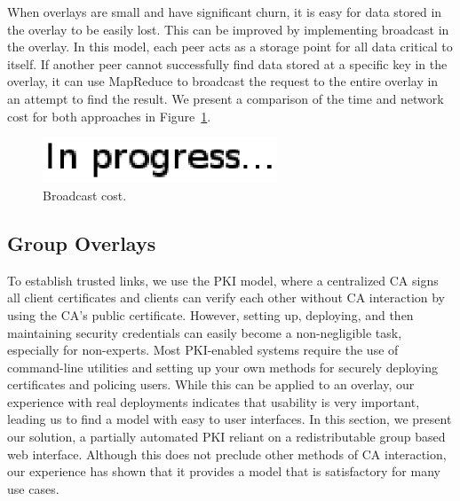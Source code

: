 \documentclass[conference]{IEEEtran}
\begin{document}
When overlays are small and have significant churn, it is easy for data stored
in the overlay to be easily lost.  This can be improved by implementing
broadcast in the overlay.  In this model, each peer acts as a
storage point for all data critical to itself.  If another peer cannot
successfully find data stored at a specific key in the overlay, it can use
MapReduce to broadcast the request to the entire overlay in an attempt to find
the result.  We present a comparison of the time and network cost for both
approaches in Figure~\ref{fig:broadcast_cost}.

\begin{figure}[h]
\centering
\includegraphics[width=2.75in]{in_progress.eps}
\caption{Broadcast cost.}
\label{fig:broadcast_cost}
\end{figure}

\subsection{Group Overlays}
\label{group_overlays}
To establish trusted links, we use the PKI model, where a centralized CA signs
all client certificates and clients can verify each other without CA interaction
by using the CA's public certificate.  However, setting up, deploying, and then
maintaining security credentials can easily become a non-negligible task,
especially for non-experts.  Most PKI-enabled systems require the use of
command-line utilities and setting up your own methods for securely
deploying certificates and policing users.  While this can be applied to an
overlay, our experience with real deployments indicates that usability is very
important, leading us to find a model with easy to user interfaces.
In this section, we present our solution, a partially automated PKI reliant on
a redistributable group based web interface.  Although this does not preclude
other methods of CA interaction, our experience has shown that it provides a
model that is satisfactory for many use cases.
\end{document}
